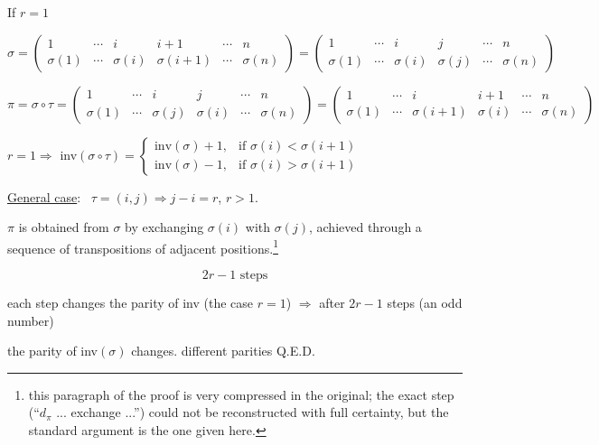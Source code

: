 \documentclass[12pt]{article}
\begin{document}
\bigskip
\noindent If $r=1$

\[
\sigma = \begin{pmatrix}1&\cdots&i&i+1&\cdots&n\\ \sigma(1)&\cdots&\sigma(i)&\sigma(i+1)&\cdots&\sigma(n)\end{pmatrix}
= \begin{pmatrix}1&\cdots&i&j&\cdots&n\\ \sigma(1)&\cdots&\sigma(i)&\sigma(j)&\cdots&\sigma(n)\end{pmatrix}
\]

\[
\pi=\sigma\circ\tau = \begin{pmatrix}1&\cdots&i&j&\cdots&n\\ \sigma(1)&\cdots&\sigma(j)&\sigma(i)&\cdots&\sigma(n)\end{pmatrix}
= \begin{pmatrix}1&\cdots&i&i+1&\cdots&n\\ \sigma(1)&\cdots&\sigma(i+1)&\sigma(i)&\cdots&\sigma(n)\end{pmatrix}
\]

\bigskip
\noindent $r=1 \Rightarrow$ inv$(\sigma\circ\tau) =
\begin{cases}
\text{inv}(\sigma)+1, & \text{if } \sigma(i)<\sigma(i+1)\\
\text{inv}(\sigma)-1, & \text{if } \sigma(i)>\sigma(i+1)
\end{cases}$

\bigskip
\noindent\underline{General case}: \ $\tau=(i,j) \Rightarrow j-i=r$, $r>1$.

\noindent $\pi$ is obtained from $\sigma$ by exchanging $\sigma(i)$ with $\sigma(j)$, achieved through a sequence of transpositions of adjacent positions.\footnote{this paragraph of the proof is very compressed in the original; the exact step (``$d_\pi$ ... exchange ...'') could not be reconstructed with full certainty, but the standard argument is the one given here.}

\[
2r-1 \text{ steps}
\]

\noindent each step changes the parity of inv (the case $r=1$) $\Rightarrow$ after $2r-1$ steps (an odd number)

\noindent the parity of inv$(\sigma)$ changes. \hfill different parities \quad Q.E.D.
\end{document}
